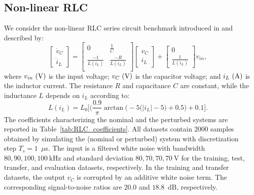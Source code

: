 \documentclass{article}
\begin{document}
\subsection{Non-linear RLC}
We consider the non-linear RLC series circuit benchmark introduced in \cite{forgione2021continuous} and described by:
\begin{equation}
\label{eq:RLC_sys}
\begin{bmatrix}
\dot v_C\\
\dot i_L
\end{bmatrix} = 
\begin{bmatrix}
  0           & \tfrac{1}{C}\\
 \tfrac{-1}{L(i_L)} & \tfrac{-R}{L(i_L)}\\
\end{bmatrix}
\begin{bmatrix}
v_C\\
i_L
\end{bmatrix} +
\begin{bmatrix}
0\\
\tfrac{1}{L(i_L)}
\end{bmatrix} 
v_{in},
\end{equation}
where $v_{in}~\rm(V)$ is the input voltage; $v_C~\rm(V)$ is the capacitor voltage; and $i_L~\rm(A)$ is the inductor current. The resistance $R$ and capacitance $C$ are constant, while the inductance $L$ depends on $i_L$ according to:
\begin{equation*}
 L(i_L) = L_0\bigg[\bigg(\frac{0.9}{\pi}\arctan\big(-\!5(|i_L|-5\big)+0.5\bigg) + 0.1 \bigg]. 
\end{equation*}
The coefficients characterizing the nominal and the perturbed systems are reported in 
Table~\ref{tab:RLC_coefficients}. 
All datasets contain 2000 samples obtained by simulating the (nominal or perturbed) system with discretization step $T_s = 1$~$\mu$s. 
The input is a filtered white noise with bandwidth $80, 90, 100, 100~\text{kHz}$ and standard deviation $80, 70, 70, 70~\text{V}$ for the training, test, transfer, and evaluation datasets, respectively. 
In the training and transfer datasets, the output $v_C$ is corrupted by an additive white noise term. The corresponding signal-to-noise ratios are $20.0$ and $18.8$~dB, respectively.
\end{document}
